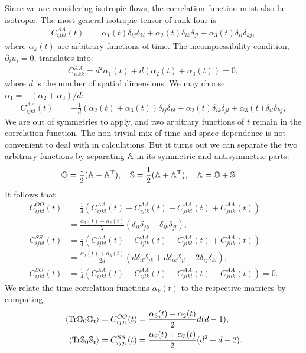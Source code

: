 \documentclass[thesis.tex]{subfiles}
\begin{document}
Since we are considering isotropic flows, the correlation function must also be isotropic. The most general isotropic tensor of rank four is
\begin{align*}
	C^{AA}_{ijkl}(t) &= \alpha_1(t)\delta_{ij}\delta_{kl}+\alpha_2(t)\delta_{ik}\delta_{jl}+\alpha_3(t)\delta_{il}\delta_{kj},
\end{align*}
where $\alpha_k(t)$ are arbitrary functions of time. The incompressibility condition, $\partial_iu_i=0$, translates into:
\begin{align*}
	C^{AA}_{iikk} = d^2 \alpha_1(t) + d(\alpha_2(t)+\alpha_3(t)) = 0,
\end{align*}
where $d$ is the number of spatial dimensions. We may choose $\alpha_1 = -(\alpha_2+\alpha_3)/d$:
\begin{align*}
	C^{AA}_{ijkl}(t) &=-\frac{1}{d}(\alpha_2(t)+\alpha_3(t))\delta_{ij}\delta_{kl}+\alpha_2(t)\delta_{ik}\delta_{jl}+\alpha_3(t)\delta_{il}\delta_{kj},
\end{align*}
We are out of symmetries to apply, and two arbitrary functions of $t$ remain in the correlation function. The non-trivial mix of time and space dependence is not convenient to deal with in calculations. But it turns out we can separate the two arbitrary functions by separating $\mathbb{A} $ in its symmetric and antisymmetric parts:
\begin{align*}
	&\mathbb{O} = \frac{1}{2}(\mathbb{A} - \mathbb{A}^{\mathrm T}),\quad
	\mathbb{S} = \frac{1}{2}(\mathbb{A} + \mathbb{A}^{\mathrm T}),\quad
	\mathbb{A} = \mathbb{O} + \mathbb{S}.
\end{align*}
It follows that
\begin{align*}
	C^{OO}_{ijkl}(t) &= \frac{1}{4}\left(C^{AA}_{ijkl}(t) - C^{AA}_{ijlk}(t) - C^{AA}_{jikl}(t) + C^{AA}_{jilk}(t)\right) \\
	&= \frac{\alpha_3(t)-\alpha_2(t)}{2}(\delta_{il}\delta_{jk} - \delta_{ik}\delta_{jl}), \\
	C^{SS}_{ijkl}(t) &= \frac{1}{4}\left(C^{AA}_{ijkl}(t) + C^{AA}_{ijlk}(t) + C^{AA}_{jikl}(t) + C^{AA}_{jilk}(t)\right) \\
	&= \frac{\alpha_2(t)+\alpha_3(t)}{2d}(d\delta_{il}\delta_{jk} + d\delta_{ik}\delta_{jl} - 2\delta_{ij}\delta_{kl}), \\
	C^{SO}_{ijkl}(t) &= \frac{1}{4}\left(C^{AA}_{ijkl}(t) - C^{AA}_{ijlk}(t) + C^{AA}_{jikl}(t) - C^{AA}_{jilk}(t)\right) = 0.
\end{align*}
We relate the time correlation functions $\alpha_k(t)$ to the respective matrices by computing
\begin{align}
	\left\langle \tr \ma O_0\ma O_t\right\rangle &= C^{OO}_{ijji}(t) = \frac{\alpha_3(t)-\alpha_2(t)}{2}d(d-1), \nn\\
	\left\langle \tr \ma S_0\ma S_t\right\rangle &= C^{SS}_{ijji}(t) = \frac{\alpha_2(t)+\alpha_3(t)}{2}(d^2+d-2).\eqnlab{turbtraces2}
\end{align}
\end{document}
